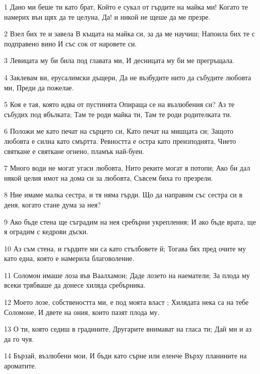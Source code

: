 \par 1 Дано ми беше ти като брат, Който е сукал от гърдите на майка ми! Когато те намерих вън щях да те целуна, Да! и никой не щеше да ме презре.
\par 2 Взел бих те и завела В къщата на майка си, за да ме научиш; Напоила бих те с подправено вино И със сок от наровете си.
\par 3 Левицата му би била под главата ми, И десницата му би ме прегръщала.
\par 4 Заклевам ви, ерусалимски дъщери, Да не възбудите нито да събудите любовта ми, Преди да пожелае.
\par 5 Коя е тая, която идва от пустинята Опираща се на възлюбения си? Аз те събудих под ябълката; Там те роди майка ти, Там те роди родителката ти.
\par 6 Положи ме като печат на сърцето си, Като печат на мишцата си; Защото любовта е силна като смъртта. Ревността е остра като преизподнята, Чието святкане е святкане огнено, пламък най-буен.
\par 7 Много води не могат угаси любовта, Нито реките могат я потопи; Ако би дал някой целия имот на дома си за любовта, Съвсем биха го презрели.
\par 8 Ние имаме малка сестра, и тя няма гърди. Що да направим със сестра си в деня, когато стане дума за нея?
\par 9 Ако бъде стена ще съградим на нея сребърни укрепления; И ако бъде врата, ще я оградим с кедрови дъски.
\par 10 Аз съм стена, и гърдите ми са като стълбовете й; Тогава бях пред очите му като една, която е намерила благоволение.
\par 11 Соломон имаше лоза във Ваалхамон; Даде лозето на наематели; За плода му всеки трябваше да донесе хиляда сребърника.
\par 12 Моето лозе, собствеността ми, е под моята власт ; Хилядата нека са на тебе Соломоне, И двете на ония, които пазят плода му.
\par 13 О ти, която седиш в градините, Другарите внимават на гласа ти; Дай ми и аз да го чуя.
\par 14 Бързай, възлюбени мои, И бъди като сърне или еленче Върху планините на ароматите.

